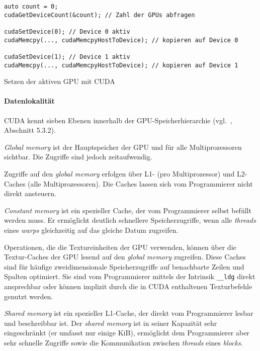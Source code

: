 \begin{code}
    \begin{verbatim}
auto count = 0;
cudaGetDeviceCount(&count); // Zahl der GPUs abfragen

cudaSetDevice(0); // Device 0 aktiv
cudaMemcpy(..., cudaMemcpyHostToDevice); // kopieren auf Device 0

cudaSetDevice(1); // Device 1 aktiv
cudaMemcpy(..., cudaMemcpyHostToDevice); // kopieren auf Device 1
    \end{verbatim}
    \caption{Setzen der aktiven GPU mit CUDA}
    \label{vergleich:cuda:datensicht:setdevice}
\end{code}

\paragraph{Datenlokalität}

CUDA kennt sieben Ebenen innerhalb der GPU-Speicherhierarchie
(vgl.~\cite{cudaguide}, Abschnitt 5.3.2).

\textit{Global memory} ist der Hauptspeicher der GPU und für alle
Multiprozessoren sichtbar. Die Zugriffe sind jedoch zeitaufwendig.

Zugriffe auf den \textit{global memory} erfolgen über L1- (pro Multiprozessor)
und L2-Caches (alle Multiprozessoren). Die Caches lassen sich vom Programmierer
nicht direkt ansteuern.

\textit{Constant memory} ist ein spezieller Cache, der vom Programmierer selbst
befüllt werden muss. Er ermöglicht deutlich schnellere Speicherzugriffe, wenn
alle \textit{threads} eines \textit{warps} gleichzeitig auf das gleiche Datum
zugreifen.

Operationen, die die Textureinheiten der GPU verwenden, können über die
Textur-Caches der GPU lesend auf den \textit{global memory} zugreifen. Diese
Caches sind für häufige zweidimensionale Speicherzugriffe auf benachbarte Zeilen
und Spalten optimiert. Sie sind vom Programmierer mittels der Intrinsik
\texttt{\_\_ldg} direkt ansprechbar oder können implizit durch die in CUDA
enthaltenen Texturbefehle genutzt werden.

\textit{Shared memory} ist ein spezieller L1-Cache, der direkt vom Programmierer
lesbar und beschreibbar ist. Der \textit{shared memory} ist in seiner Kapazität
sehr eingeschränkt (er umfasst nur einige KiB), ermöglicht dem Programmierer
aber sehr schnelle Zugriffe sowie die Kommunikation zwischen \textit{threads}
eines \textit{blocks}.

